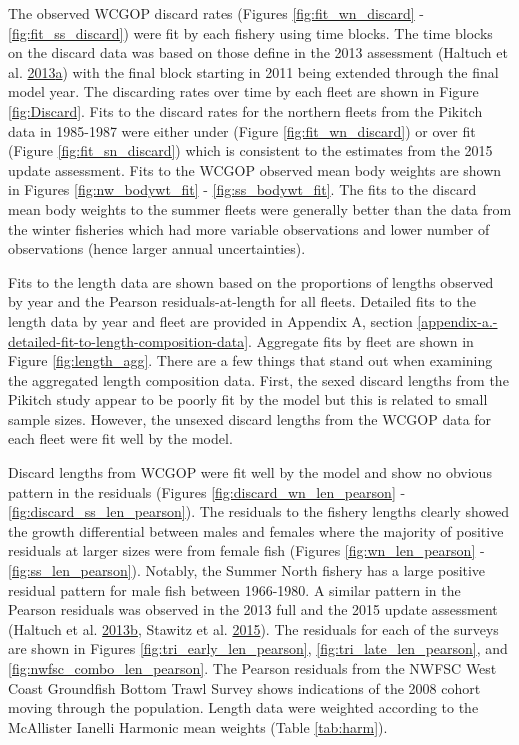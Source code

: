 \documentclass[12pt,]{article}
\begin{document}
The observed WCGOP discard rates (Figures \ref{fig:fit_wn_discard} -
\ref{fig:fit_ss_discard}) were fit by each fishery using time blocks.
The time blocks on the discard data was based on those define in the
2013 assessment (Haltuch et al.
\protect\hyperlink{ref-haltuch_california_2013}{2013}\protect\hyperlink{ref-haltuch_california_2013}{a})
with the final block starting in 2011 being extended through the final
model year. The discarding rates over time by each fleet are shown in
Figure \ref{fig:Discard}. Fits to the discard rates for the northern
fleets from the Pikitch data in 1985-1987 were either under (Figure
\ref{fig:fit_wn_discard}) or over fit (Figure \ref{fig:fit_sn_discard})
which is consistent to the estimates from the 2015 update assessment.
Fits to the WCGOP observed mean body weights are shown in Figures
\ref{fig:nw_bodywt_fit} - \ref{fig:ss_bodywt_fit}. The fits to the
discard mean body weights to the summer fleets were generally better
than the data from the winter fisheries which had more variable
observations and lower number of observations (hence larger annual
uncertainties).

Fits to the length data are shown based on the proportions of lengths
observed by year and the Pearson residuals-at-length for all fleets.
Detailed fits to the length data by year and fleet are provided in
Appendix A, section
\ref{appendix-a.-detailed-fit-to-length-composition-data}. Aggregate
fits by fleet are shown in Figure \ref{fig:length_agg}. There are a few
things that stand out when examining the aggregated length composition
data. First, the sexed discard lengths from the Pikitch study appear to
be poorly fit by the model but this is related to small sample sizes.
However, the unsexed discard lengths from the WCGOP data for each fleet
were fit well by the model.

Discard lengths from WCGOP were fit well by the model and show no
obvious pattern in the residuals (Figures
\ref{fig:discard_wn_len_pearson} - \ref{fig:discard_ss_len_pearson}).
The residuals to the fishery lengths clearly showed the growth
differential between males and females where the majority of positive
residuals at larger sizes were from female fish (Figures
\ref{fig:wn_len_pearson} - \ref{fig:ss_len_pearson}). Notably, the
Summer North fishery has a large positive residual pattern for male fish
between 1966-1980. A similar pattern in the Pearson residuals was
observed in the 2013 full and the 2015 update assessment (Haltuch et al.
\protect\hyperlink{ref-haltuch_status_2013}{2013}\protect\hyperlink{ref-haltuch_status_2013}{b},
Stawitz et al. \protect\hyperlink{ref-stawitz_stock_2015}{2015}). The
residuals for each of the surveys are shown in Figures
\ref{fig:tri_early_len_pearson}, \ref{fig:tri_late_len_pearson}, and
\ref{fig:nwfsc_combo_len_pearson}. The Pearson residuals from the NWFSC
West Coast Groundfish Bottom Trawl Survey shows indications of the 2008
cohort moving through the population. Length data were weighted
according to the McAllister Ianelli Harmonic mean weights (Table
\ref{tab:harm}).
\end{document}
